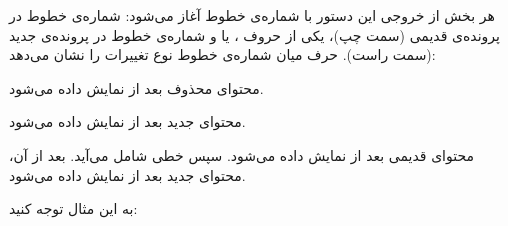 \documentclass{utap}
\begin{document}
	هر بخش از خروجی این دستور با شماره‌ی خطوط آغاز می‌شود: شماره‌ی خطوط در پرونده‌ی قدیمی (سمت چپ)، یکی از حروف ،  یا  و شماره‌ی خطوط در پرونده‌ی جدید (سمت راست). حرف میان شماره‌ی خطوط نوع تغییرات را نشان می‌دهد:
	\begin{description}[leftmargin=8em,style=nextline,font=\labelitemi\quad\bfseries]
		\item[\lr{\texttt{d}}: حذف~شدن]
		محتوای محذوف بعد از \lr{\lstinline[language=diff]{<}} نمایش داده می‌شود.
		\item[\lr{\texttt{a}}: افزوده~شدن]
		محتوای جدید بعد از \lr{\lstinline[language=diff]{>}} نمایش داده می‌شود.
		\item[\lr{\texttt{c}}: تغییر]
		محتوای قدیمی بعد از \lr{\lstinline[language=diff]{<}} نمایش داده می‌شود.
		سپس خطی شامل \lr{\lstinline[language=diff]{---}} می‌آید.
		بعد از آن، محتوای جدید بعد از \lr{\lstinline[language=diff]{>}} نمایش داده می‌شود.
	\end{description}
	
	به این مثال توجه کنید:
	\begin{latin}%
		\centering
		\begin{minipage}[t]{0.28\textwidth}
			{}
		\end{minipage}%
		\begin{minipage}[t]{0.28\textwidth}
			{}
		\end{minipage}%
		\begin{minipage}[t]{0.28\textwidth}
			
		\end{minipage}
	\end{latin}    
	
\end{document}
